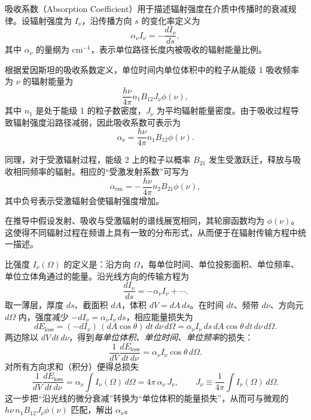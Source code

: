 
吸收系数（Absorption Coefficient）用于描述辐射强度在介质中传播时的衰减规律。设辐射强度为 $I_\nu$，沿传播方向 $s$ 的变化率定义为
\[
\alpha_\nu I_\nu = -\frac{dI_\nu}{ds},
\]
其中 $\alpha_\nu$ 的量纲为 $\mathrm{cm^{-1}}$，表示单位路径长度内被吸收的辐射能量比例。

根据爱因斯坦的吸收系数定义，单位时间内单位体积中的粒子从能级 1 吸收频率为 $\nu$ 的辐射能量为
\[
\frac{h\nu}{4\pi} n_1 B_{12} J_\nu \phi(\nu),
\]
其中 $n_1$ 是处于能级 1 的粒子数密度，$J_\nu$ 为平均辐射能量密度。由于吸收过程导致辐射强度沿路径减弱，因此吸收系数可表示为
\[
\alpha_\nu = \frac{h\nu}{4\pi} n_1 B_{12}\phi(\nu).
\]

同理，对于受激辐射过程，能级 2 上的粒子以概率 $B_{21}$ 发生受激跃迁，释放与吸收相同频率的辐射。相应的“受激发射系数”可写为
\[
\alpha_{\mathrm{em}} = -\,\frac{h\nu}{4\pi} n_2 B_{21}\phi(\nu),
\]
其中负号表示受激辐射会使辐射强度增加。

在推导中假设发射、吸收与受激辐射的谱线展宽相同，其轮廓函数均为 $\phi(\nu)$。  
这使得不同辐射过程在频谱上具有一致的分布形式，从而便于在辐射传输方程中统一描述。

\begin{derivationnote}[吸收系数和单位体积内能量损失的关系]
比强度 $I_\nu(\Omega)$ 的定义是：沿方向 $\Omega$，每单位时间、单位投影面积、单位频率、
单位立体角通过的能量。沿光线方向的传输方程为
\[
\frac{d I_\nu}{ds}=-\alpha_\nu I_\nu + \cdots .
\]
取一薄层，厚度 $ds$、截面积 $dA$，体积 $dV=dA\,ds$。在时间 $dt$、频带 $d\nu$、方向元
$d\Omega$ 内，强度减少 $-dI_\nu=\alpha_\nu I_\nu\,ds$，相应能量损失为
\[
dE_{\mathrm{loss}} = (-dI_\nu)\,(dA\cos\theta)\,dt\,d\nu\,d\Omega
= \alpha_\nu I_\nu\,ds\,dA\cos\theta\,dt\,d\nu\,d\Omega .
\]
两边除以 $dV\,dt\,d\nu$，得到\emph{每单位体积、单位时间、单位频率}的损失：
\[
\frac{1}{dV}\frac{dE_{\mathrm{loss}}}{dt\,d\nu}
= \alpha_\nu I_\nu \cos\theta\, d\Omega .
\]
对所有方向求和（积分）便得总损失
\[
\frac{1}{dV}\frac{dE_{\mathrm{loss}}}{dt\,d\nu}
= \alpha_\nu \int I_\nu(\Omega)\, d\Omega
= 4\pi\,\alpha_\nu\,J_\nu,
\qquad
J_\nu \equiv \frac{1}{4\pi}\int I_\nu(\Omega)\,d\Omega .
\]
这一步把“沿光线的微分衰减”转换为“单位体积的能量损失”，从而可与微观的
$h\nu\,n_1B_{12}J_\nu\phi(\nu)$ 匹配，解出 $\alpha_\nu$。
\end{derivationnote}

